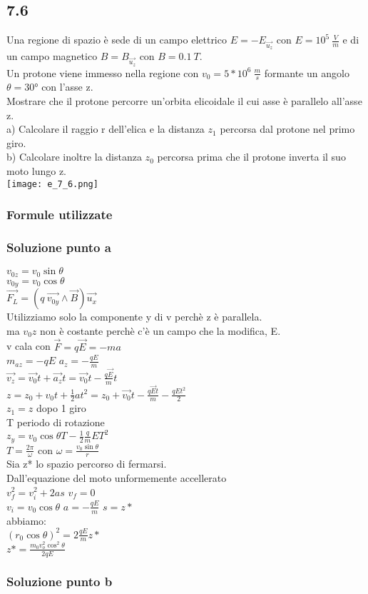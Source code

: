 \documentclass[../../main.tex]{subfiles}
\begin{document}
\subsection*{7.6}
Una regione di spazio è sede di un campo elettrico $E = -E_{\vec{u_z}}$ con $E = 10^5\ \frac{V}{m}$ e di un campo magnetico $B = B_{\vec{u_z}}$ con $B=0.1\ T$.
\\Un protone viene immesso nella regione con $v_0 = 5 * 10^6\ \frac{m}{s}$ formante un angolo $\theta = 30°$ con l'asse z.
\\Mostrare che il protone percorre un'orbita elicoidale il cui asse è parallelo all'asse z.
\\a) Calcolare il raggio r dell'elica e la distanza $z_1$ percorsa dal protone nel primo giro.
\\b) Calcolare inoltre la distanza $z_0$ percorsa prima che il protone inverta il suo moto lungo z.
\\\texttt{[image: e\_7\_6.png]}
\subsubsection*{Formule utilizzate}
\subsubsection*{Soluzione punto a}
$v_{0z} = v_0\sin\theta$
\\$v_{0y} = v_0\cos\theta$
\\$\vec{F_L}= \left(q\ \vec{v_{0y}}\wedge\vec{B}\right)\vec{u_x}$
\\Utilizziamo solo la componente y di v perchè z è parallela.
\\ma $v_0z$ non è costante perchè c'è un campo che la modifica, E.
\\v cala con $\vec{F} = q\vec{E} = -ma$
\\$m_{az} = -qE$   $a_z = -\frac{qE}{m}$
\\$\vec{v_z} = \vec{v_0}t + \vec{a_z}t = \vec{v_0}t-\frac{q\vec{E}}{m}t$
\\$z = z_0 + v_0t + \frac{1}{2}at^2 = z_0 + \vec{v_0}t - \frac{q\vec{E}t}{m}-\frac{qEt^2}{2}$
\\$z_1 = z$ dopo 1 giro
\\T periodo di rotazione
\\$z_y = v_0\cos\theta T - \frac{1}{2}\frac{q}{m}ET^2$
\\$T = \frac{2\pi}{\omega}$ con $\omega = \frac{v_0\sin\theta}{r}$
\\Sia z* lo spazio percorso di fermarsi.
\\Dall'equazione del moto unformemente accellerato
\\$v_f^2 = v_i^2 + 2as$   $v_f = 0$
\\$v_i = v_0\cos\theta$   $a = -\frac{qE}{m}$   $s=z*$
\\abbiamo:
\\$(r_0\cos\theta)^2 = 2\frac{qE}{m}z*$
\\$z* = \frac{m_0v_o^2\cos^2\theta}{2qE}$
\subsubsection*{Soluzione punto b}
\newpage
\end{document}
